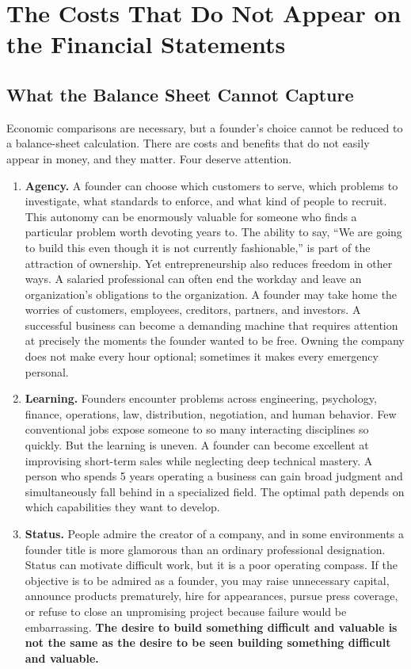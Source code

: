 \section{The Costs That Do Not Appear on the Financial Statements}

\subsection{What the Balance Sheet Cannot Capture}

Economic comparisons are necessary, but a founder's choice cannot be reduced to a balance-sheet calculation. There are costs and benefits that do not easily appear in money, and they matter. Four deserve attention.

\begin{enumerate}[label=\textbf{\arabic*.},leftmargin=11pt,itemsep=1.5pt,topsep=1.5pt,parsep=0pt]
  \item \textbf{Agency.} A founder can choose which customers to serve, which problems to investigate, what standards to enforce, and what kind of people to recruit. This autonomy can be enormously valuable for someone who finds a particular problem worth devoting years to. The ability to say, ``We are going to build this even though it is not currently fashionable,'' is part of the attraction of ownership. Yet entrepreneurship also reduces freedom in other ways. A salaried professional can often end the workday and leave an organization's obligations to the organization. A founder may take home the worries of customers, employees, creditors, partners, and investors. A successful business can become a demanding machine that requires attention at precisely the moments the founder wanted to be free. Owning the company does not make every hour optional; sometimes it makes every emergency personal.
  \item \textbf{Learning.} Founders encounter problems across engineering, psychology, finance, operations, law, distribution, negotiation, and human behavior. Few conventional jobs expose someone to so many interacting disciplines so quickly. But the learning is uneven. A founder can become excellent at improvising short-term sales while neglecting deep technical mastery. A person who spends 5 years operating a business can gain broad judgment and simultaneously fall behind in a specialized field. The optimal path depends on which capabilities they want to develop.
  \item \textbf{Status.} People admire the creator of a company, and in some environments a founder title is more glamorous than an ordinary professional designation. Status can motivate difficult work, but it is a poor operating compass. If the objective is to be admired as a founder, you may raise unnecessary capital, announce products prematurely, hire for appearances, pursue press coverage, or refuse to close an unpromising project because failure would be embarrassing. \textbf{The desire to build something difficult and valuable is not the same as the desire to be seen building something difficult and valuable.}

\end{enumerate}
